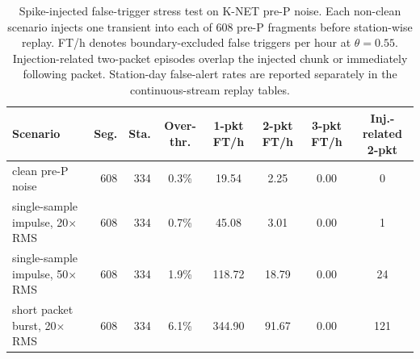 \begin{table}[!t]
\centering
\caption{Spike-injected false-trigger stress test on K-NET pre-P noise. Each non-clean scenario injects one transient into each of 608 pre-P fragments before station-wise replay. FT/h denotes boundary-excluded false triggers per hour at $\theta=0.55$. Injection-related two-packet episodes overlap the injected chunk or immediately following packet. Station-day false-alert rates are reported separately in the continuous-stream replay tables.}
\label{tab:spike_false_alarm}
{\scriptsize\setlength{\tabcolsep}{1.8pt}\renewcommand{\arraystretch}{1.04}
\begin{tabular}{@{}lrrccccc@{}}
\toprule
Scenario & Seg. & Sta. & Over-thr. & 1-pkt FT/h & 2-pkt FT/h & 3-pkt FT/h & Inj.-related 2-pkt\\
\midrule
clean pre-P noise & 608 & 334 & 0.3\% & 19.54 & 2.25 & 0.00 & 0\\
single-sample impulse, 20$\times$ RMS & 608 & 334 & 0.7\% & 45.08 & 3.01 & 0.00 & 1\\
single-sample impulse, 50$\times$ RMS & 608 & 334 & 1.9\% & 118.72 & 18.79 & 0.00 & 24\\
short packet burst, 20$\times$ RMS & 608 & 334 & 6.1\% & 344.90 & 91.67 & 0.00 & 121\\
\bottomrule
\end{tabular}}
\end{table}
